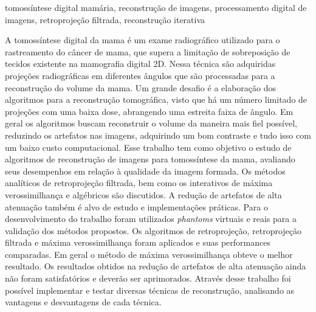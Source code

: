 \documentclass[qualimst]{eesc}
\begin{document}
%
\begin{resumo}{tomossíntese digital mamária, reconstrução de imagens, processamento digital de imagens, retroprojeção filtrada, reconstrução iterativa}

	A tomossíntese digital da mama é um exame radiográfico utilizado para o rastreamento do câncer de mama, que supera a limitação de sobreposição de tecidos existente na mamografia digital \acs{2D}. Nessa técnica são adquiridas projeções radiográficas em diferentes ângulos que são processadas para a reconstrução do volume da mama. Um grande desafio é a elaboração dos algoritmos para a reconstrução tomográfica, visto que há um número limitado de projeções com uma baixa dose, abrangendo uma estreita faixa de ângulo. Em geral os algoritmos buscam reconstruir o volume da maneira mais fiel possível, reduzindo os artefatos nas imagens, adquirindo um bom contraste e tudo isso com um baixo custo computacional. Esse trabalho tem como objetivo o estudo de algoritmos de reconstrução de imagens para tomossíntese da mama, avaliando seus desempenhos em relação à qualidade da imagem formada. Os métodos analíticos de retroprojeção filtrada, bem como os interativos de máxima verossimilhança e algébricos são discutidos. A redução de artefatos de alta atenuação também é alvo de estudo e implementações práticas. Para o desenvolvimento do trabalho foram utilizados \textit{phantoms} virtuais e reais para a validação dos métodos propostos. Os algoritmos de retroprojeção, retroprojeção filtrada e máxima verossimilhança foram aplicados e suas performances comparadas. Em geral o método de máxima verossimilhança obteve o melhor resultado. Os resultados obtidos na redução de artefatos de alta atenuação ainda não foram satisfatórios e deverão ser aprimorados. Através desse trabalho foi possível implementar e testar diversas técnicas de reconstrução, analisando as vantagens e desvantagens de cada técnica.      	

\end{resumo}
\end{document}
